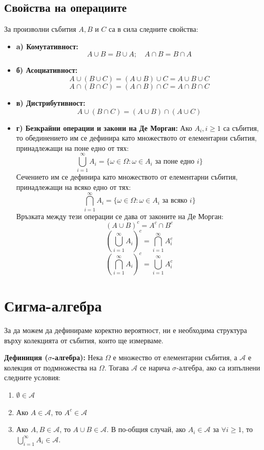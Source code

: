\documentclass{article}
\begin{document}
\subsection*{Свойства на операциите}
За произволни събития $A, B$ и $C$ са в сила следните свойства:
\begin{itemize}
    \item \textbf{a) Комутативност:}
    \[ A \cup B = B \cup A; \quad A \cap B = B \cap A \]
    \item \textbf{б) Асоциативност:}
    \[ A \cup (B \cup C) = (A \cup B) \cup C = A \cup B \cup C \]
    \[ A \cap (B \cap C) = (A \cap B) \cap C = A \cap B \cap C \]
    \item \textbf{в) Дистрибутивност:}
    \[ A \cup (B \cap C) = (A \cup B) \cap (A \cup C) \]
    \item \textbf{г) Безкрайни операции и закони на Де Морган:}
    Ако $A_i, i \ge 1$ са събития, то обединението им се дефинира като множеството от елементарни събития, принадлежащи на поне едно от тях:
    \[ \bigcup_{i=1}^{\infty} A_i = \{ \omega \in \Omega : \omega \in A_i \text{ за поне едно } i \} \]
    Сечението им се дефинира като множеството от елементарни събития, принадлежащи на всяко едно от тях:
    \[ \bigcap_{i=1}^{\infty} A_i = \{ \omega \in \Omega : \omega \in A_i \text{ за всяко } i \} \]
    Връзката между тези операции се дава от законите на Де Морган:
    \[ (A \cup B)^c = A^c \cap B^c \]
    \[ \left( \bigcup_{i=1}^{\infty} A_i \right)^c = \bigcap_{i=1}^{\infty} A_i^c \]
    \[ \left( \bigcap_{i=1}^{\infty} A_i \right)^c = \bigcup_{i=1}^{\infty} A_i^c \]
\end{itemize}

\section{Сигма-алгебра}
За да можем да дефинираме коректно вероятност, ни е необходима структура върху колекцията от събития, които ще измерваме.

\textbf{Дефиниция ($\sigma$-алгебра):} Нека $\Omega$ е множество от елементарни събития, а $\mathcal{A}$ е колекция от подмножества на $\Omega$. Тогава $\mathcal{A}$ се нарича $\sigma$-алгебра, ако са изпълнени следните условия:
\begin{enumerate}
    \item[i)] $\emptyset \in \mathcal{A}$
    \item[ii)] Ако $A \in \mathcal{A}$, то $A^c \in \mathcal{A}$
    \item[iii)] Ако $A, B \in \mathcal{A}$, то $A \cup B \in \mathcal{A}$. В по-общия случай, ако $A_i \in \mathcal{A}$ за $\forall i \ge 1$, то $\bigcup_{i=1}^{\infty} A_i \in \mathcal{A}$.
\end{enumerate}
\end{document}
